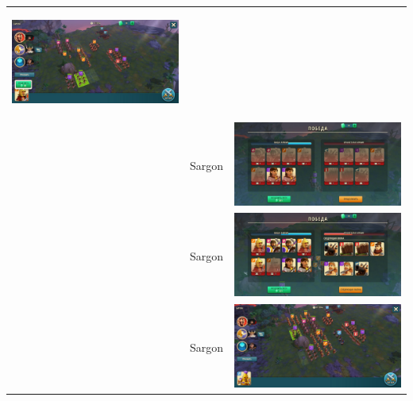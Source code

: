 \begin{longtable}{|c|c|c|}
    \hypertarget{fight38}{\includegraphics[width=0.75\linewidth]{./parts/media/TreasureHunt/38/sargon/photo_2022-04-07_13-17-31.jpg}} \\
    & Sargon &
    \includegraphics[width=0.75\linewidth]{./parts/media/TreasureHunt/38/sargon/photo_2022-04-07_13-17-35.jpg} \\
    & Sargon &
    \includegraphics[width=0.75\linewidth]{./parts/media/TreasureHunt/38/sargon/photo_2022-04-07_13-17-28.jpg} \\
    & Sargon &
    \includegraphics[width=0.75\linewidth]{./parts/media/TreasureHunt/38/sargon/photo_2022-04-07_13-17-20.jpg} \\

\end{longtable}

